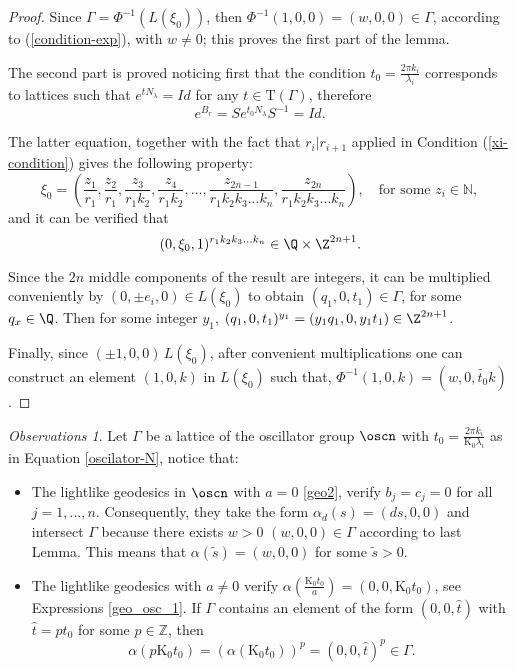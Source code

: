 \documentclass[11pt]{amsart}
\theoremstyle{plain}
\theoremstyle{definition}
\theoremstyle{remark}
\newtheorem{obs}[thm]{Observations}
\begin{document}
	\begin{proof}
		
		Since $\Gamma = \Phi^{-1}(L(\xi_0))$, then $\Phi^{-1}(1,0,0) = (w,0,0) \in \Gamma$, according to (\ref{condition-exp}), with $w \neq 0 $; this proves the first part of the lemma.
		
		The second part is proved noticing first that the condition $t_0 = \frac{2 \pi k_i}{\lambda_i}$ corresponds to lattices such that $e^{tN_\lambda} = Id$ for any $t \in \mathrm{T}(\Gamma)$, therefore $$e^{B_r} = Se^{t_0N_\lambda}S^{-1}=Id.$$
		
		The latter equation, together with the fact that $r_i | r_{i+1}$ applied in Condition (\ref{xi-condition}) gives the following property: $$\xi_0=(\frac{z_1}{r_1},\frac{z_2}{r_1}, \frac{z_3}{r_1 k_2}, \frac{z_4}{r_1 k_2}, ..., \frac{z_{2n-1}}{r_1 k_2 k_3 ... k_n}, \frac{z_{2n}}{r_1 k_2 k_3 ... k_n} ), \quad \mbox{for some } z_i \in \mathbb{N},$$ and it can be verified that $$(0,\xi_0,1)^{r_1 k_2 k_3 ... k_n} \in \Q \times \Z^{2n+1}. $$
		
		Since the $2n$ middle components of the result are integers, it can be multiplied conveniently by $(0, \pm e_i, 0) \in L(\xi_0)$ to obtain $(q_1, 0, t_1) \in \Gamma$, for some $q_x \in \Q$. Then for some integer $y_1$, $(q_1, 0, t_1)^{y_1} = (y_1 q_1, 0, y_1 t_1) \in \Z^{2n+1}$. 
		
		Finally, since $(\pm 1,0,0) \, L(\xi_0)$, after convenient multiplications one can construct an element $(1,0,k)$ in $L(\xi_0)$ such that, $\Phi^{-1}(1,0,k) = (w,0,\widetilde{t_0} k)$. 
		\end{proof}
	
	
	\begin{obs}\label{obs-osc}
		Let $\Gamma$ be a lattice of the oscillator group $\oscn$ with $t_0=\frac{2\pi k_i}{\mathrm{K_0} \lambda_i}$ as in Equation \eqref{oscilator-N}, notice that:
		\begin{itemize}
			\item The lightlike geodesics in $\oscn$ with $a=0$ \eqref{geo2}, verify $b_j=c_j=0$ for all $j=1,...,n$. Consequently, they take the form $ \alpha_d(s)=(ds,0,0)$ and intersect $\Gamma$ because there exists $w > 0$ $(w,0,0) \in \Gamma$ according to last Lemma. This means that  $\alpha(\tilde{s})=(w,0,0)$ for some $\tilde{s} > 0$.
			\item The lightlike geodesics with $a \neq 0$ verify $\alpha(\frac{\mathrm{K_0} t_0}{a}) = (0,0,\mathrm{K_0} t_0)$, see Expressions \eqref{geo_osc_1}. If $\Gamma$ contains an element of the form $(0,0,\hat{t})$ with $\hat{t}=p t_0$ for some $p \in \mathbb{Z}$, then $$\alpha(p \mathrm{K_0} t_0) = (\alpha(\mathrm{K_0} t_0))^p = (0,0,\hat{t})^p \in \Gamma.$$ 
		\end{itemize}
	\end{obs}	
		
\end{document}
